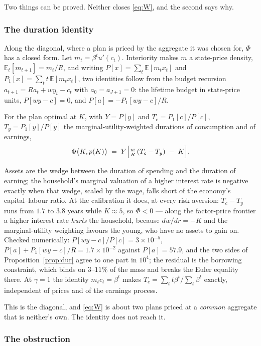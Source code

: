 Two things can be proved. Neither closes \eqref{eq:W}, and the second says why.

\subsubsection*{The duration identity}

Along the diagonal, where a plan is priced by the aggregate it was chosen for, $\Phi$ has a closed
form. Let $m_t=\beta^tu'(c_t)$. Interiority makes $m$ a state-price density,
$\mathbb E_t[m_{t+1}]=m_t/R$, and writing $P[x]=\sum_t\mathbb E[m_tx_t]$ and
$P_1[x]=\sum_t t\,\mathbb E[m_tx_t]$, two identities follow from the budget recursion
$a_{t+1}=Ra_t+wy_t-c_t$ with $a_0=a_{J+1}=0$: the lifetime budget in state-price units,
$P[w y-c]=0$, and $P[a]=-P_1[wy-c]/R$.

\begin{proposition}\label{prop:dur}
For the plan optimal at $K$, with $Y=P[y]$ and $T_c=P_1[c]/P[c]$, $T_y=P_1[y]/P[y]$ the
marginal-utility-weighted durations of consumption and of earnings,
\[
  \Phi\bigl(K,p(K)\bigr)\;=\;Y\Bigl[\tfrac{w}{R}\,(T_c-T_y)\;-\;K\Bigr].
\]
\end{proposition}

Assets are the wedge between the duration of spending and the duration of earning; the household's
marginal valuation of a higher interest rate is negative exactly when that wedge, scaled by the
wage, falls short of the economy's capital--labour ratio. At the calibration it does, at every risk
aversion: $T_c-T_y$ runs from $1.7$ to $3.8$ years while $K\approx5$, so $\Phi<0$ --- along the
factor-price frontier a higher interest rate \emph{hurts} the household, because $dw/dr=-K$ and the
marginal-utility weighting favours the young, who have no assets to gain on. Checked numerically:
$P[wy-c]/P[c]=3\times10^{-5}$, $P[a]+P_1[wy-c]/R = 1.7\times10^{-2}$ against $P[a]=57.9$, and the
two sides of Proposition~\ref{prop:dur} agree to one part in $10^{4}$; the residual is the
borrowing constraint, which binds on $3$--$11\%$ of the mass and breaks the Euler equality there.
At $\gamma=1$ the identity $m_tc_t=\beta^t$ makes $T_c=\sum_t t\beta^t/\sum_t\beta^t$ exactly,
independent of prices and of the earnings process.

This is the diagonal, and \eqref{eq:W} is about two plans priced at a \emph{common} aggregate that
is neither's own. The identity does not reach it.

\subsubsection*{The obstruction}

